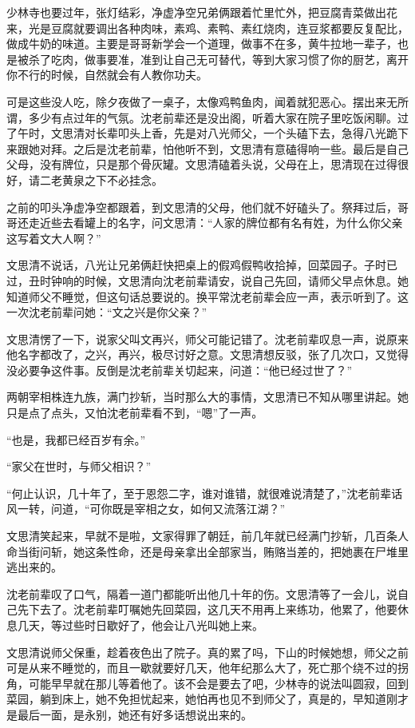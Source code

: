 少林寺也要过年，张灯结彩，净虚净空兄弟俩跟着忙里忙外，把豆腐青菜做出花来，光是豆腐就要调出各种肉味，素鸡、素鸭、素红烧肉，连豆浆都要反复配比，做成牛奶的味道。主要是哥哥新学会一个道理，做事不在多，黄牛拉地一辈子，也是被杀了吃肉，做事要准，准到让自己无可替代，等到大家习惯了你的厨艺，离开你不行的时候，自然就会有人教你功夫。

可是这些没人吃，除夕夜做了一桌子，太像鸡鸭鱼肉，闻着就犯恶心。摆出来无所谓，多少有点过年的气氛。沈老前辈还是没出阁，听着大家在院子里吃饭闲聊。过了午时，文思清对长辈叩头上香，先是对八光师父，一个头磕下去，急得八光跪下来跟她对拜。之后是沈老前辈，怕他听不到，文思清有意磕得响一些。最后是自己父母，没有牌位，只是那个骨灰罐。文思清磕着头说，父母在上，思清现在过得很好，请二老黄泉之下不必挂念。

之前的叩头净虚净空都跟着，到文思清的父母，他们就不好磕头了。祭拜过后，哥哥还走近些去看罐上的名字，问文思清：“人家的牌位都有名有姓，为什么你父亲这写着文大人啊？”

文思清不说话，八光让兄弟俩赶快把桌上的假鸡假鸭收拾掉，回菜园子。子时已过，丑时钟响的时候，文思清向沈老前辈请安，说自己先回，请师父早点休息。她知道师父不睡觉，但这句话总要说的。换平常沈老前辈会应一声，表示听到了。这一次沈老前辈问她：“文之兴是你父亲？”

文思清愣了一下，说家父叫文再兴，师父可能记错了。沈老前辈叹息一声，说原来他名字都改了，之兴，再兴，极尽讨好之意。文思清想反驳，张了几次口，又觉得没必要争这件事。反倒是沈老前辈关切起来，问道：“他已经过世了？”

两朝宰相株连九族，满门抄斩，当时那么大的事情，文思清已不知从哪里讲起。她只是点了点头，又怕沈老前辈看不到，“嗯”了一声。

“也是，我都已经百岁有余。”

“家父在世时，与师父相识？”

“何止认识，几十年了，至于恩怨二字，谁对谁错，就很难说清楚了，”沈老前辈话风一转，问道，“可你既是宰相之女，如何又流落江湖？”

文思清笑起来，早就不是啦，文家得罪了朝廷，前几年就已经满门抄斩，几百条人命当街问斩，她这条性命，还是母亲拿出全部家当，贿赂当差的，把她裹在尸堆里逃出来的。

沈老前辈叹了口气，隔着一道门都能听出他几十年的伤。文思清等了一会儿，说自己先下去了。沈老前辈叮嘱她先回菜园，这几天不用再上来练功，他累了，他要休息几天，等过些时日歇好了，他会让八光叫她上来。

文思清说师父保重，趁着夜色出了院子。真的累了吗，下山的时候她想，师父之前可是从来不睡觉的，而且一歇就要好几天，他年纪那么大了，死亡那个绕不过的拐角，可能早早就在那儿等着他了。该不会是要去了吧，少林寺的说法叫圆寂，回到菜园，躺到床上，她不免担忧起来，她怕再也见不到师父了，真是的，早知道刚才是最后一面，是永别，她还有好多话想说出来的。
\newline

